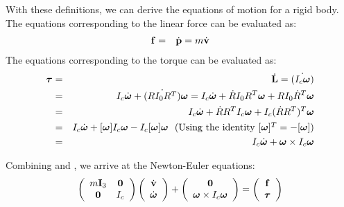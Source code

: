 With these definitions, we can derive the equations of motion for a
rigid body. The equations corresponding to the linear force can be evaluated as:
\begin{eqnarray}
\label{eq:force}
\mathbf{f} & = & \dot{\mathbf{p}} = m \dot{\mathbf{v}}
\end{eqnarray}
The equations corresponding to the torque can be evaluated as:
\begin{eqnarray}
\label{eq:torque}
\nonumber
\bm{\tau} & = & \dot{\mathbf{L}} = \dot{(I_c \bm{\omega})} \\
\nonumber
& = & I_c\dot{\bm{\omega}} + \dot{(RI_0 R^T)}\bm{\omega} = I_c\dot{\bm{\omega}} + \dot{R}I_0 R^T\bm{\omega} + R I_0 \dot{R}^T\bm{\omega}\\
\nonumber
& = & I_c\dot{\bm{\omega}} + \dot{R}R^T I_c \bm{\omega} + I_c
(\dot{R}R^T)^T\bm{\omega} \\ \nonumber
& = & I_c\dot{\bm{\omega}} + [\bm{\omega}]I_c \bm{\omega} -
I_c[\bm{\omega}]\bm{\omega}  \mbox{\ \ (Using the identity $[\bm{\omega}]^T = -[\bm{\omega}]$)}\\ 
&= & I_c\dot{\bm{\omega}} + \bm{\omega} \times I_c \bm{\omega}
\end{eqnarray}

Combining  and , we arrive at the
Newton-Euler equations:
\begin{equation}
\label{eq:newtoneuler}
\left(
\begin{array}{cc}
m\mathbf{I}_3 & \mathbf{0} \\
\mathbf{0} & I_c 
\end{array}
\right)
\left(
\begin{array}{c}
\dot{\mathbf{v}} \\
\dot{\bm{\omega}} 
\end{array}
\right) +
\left(
\begin{array}{c}
\mathbf{0}  \\
\bm{\omega} \times I_c \bm{\omega} 
\end{array}
\right) = 
\left(
\begin{array}{c}
\mathbf{f} \\
\bm{\tau} 
\end{array}
\right)
\end{equation}

